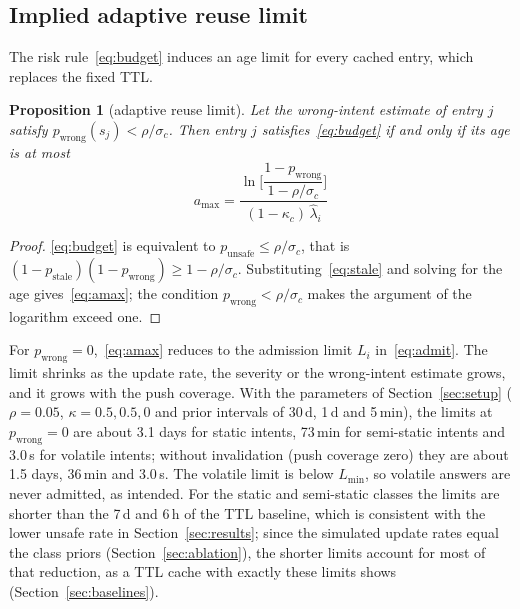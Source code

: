 \documentclass[journal]{IEEEtran}
\newtheorem{proposition}{Proposition}
\newcommand{\hatlam}{\hat{\lambda}}
\begin{document}
\subsection{Implied adaptive reuse limit}\label{sec:reuse}
The risk rule~\eqref{eq:budget} induces an age limit for every cached entry, which replaces the fixed TTL.

\begin{proposition}[adaptive reuse limit]\label{prop:reuse}
Let the wrong-intent estimate of entry $j$ satisfy $p_{\text{wrong}}(s_j)<\rho/\sigma_c$. Then entry $j$ satisfies~\eqref{eq:budget} if and only if its age is at most
\begin{equation}
a_{\max}=\frac{\ln\!\Big[\dfrac{1-p_{\text{wrong}}}{1-\rho/\sigma_c}\Big]}{(1-\kappa_c)\,\hatlam_i}\label{eq:amax}
\end{equation}
\end{proposition}
\begin{proof}
\eqref{eq:budget} is equivalent to $p_{\text{unsafe}}\le\rho/\sigma_c$, that is $(1-p_{\text{stale}})(1-p_{\text{wrong}})\ge 1-\rho/\sigma_c$. Substituting~\eqref{eq:stale} and solving for the age gives~\eqref{eq:amax}; the condition $p_{\text{wrong}}<\rho/\sigma_c$ makes the argument of the logarithm exceed one.
\end{proof}
For $p_{\text{wrong}}=0$,~\eqref{eq:amax} reduces to the admission limit $L_i$ in~\eqref{eq:admit}. The limit shrinks as the update rate, the severity or the wrong-intent estimate grows, and it grows with the push coverage. With the parameters of Section~\ref{sec:setup} ($\rho=0.05$, $\kappa=0.5,0.5,0$ and prior intervals of 30\,d, 1\,d and 5\,min), the limits at $p_{\text{wrong}}=0$ are about 3.1 days for static intents, 73\,min for semi-static intents and 3.0\,s for volatile intents; without invalidation (push coverage zero) they are about 1.5 days, 36\,min and 3.0\,s. The volatile limit is below $L_{\min}$, so volatile answers are never admitted, as intended. For the static and semi-static classes the limits are shorter than the 7\,d and 6\,h of the TTL baseline, which is consistent with the lower unsafe rate in Section~\ref{sec:results}; since the simulated update rates equal the class priors (Section~\ref{sec:ablation}), the shorter limits account for most of that reduction, as a TTL cache with exactly these limits shows (Section~\ref{sec:baselines}).
\end{document}
